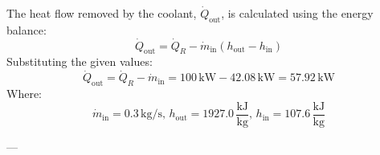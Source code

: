 The heat flow removed by the coolant, \( \dot{Q}_{\text{out}} \), is calculated using the energy balance:  
\[
\dot{Q}_{\text{out}} = \dot{Q}_R - \dot{m}_{\text{in}} (h_{\text{out}} - h_{\text{in}})
\]  
Substituting the given values:  
\[
\dot{Q}_{\text{out}} = \dot{Q}_R - \dot{m}_{\text{in}} = 100 \, \text{kW} - 42.08 \, \text{kW} = 57.92 \, \text{kW}
\]  
Where:  
\[
\dot{m}_{\text{in}} = 0.3 \, \text{kg/s}, \, h_{\text{out}} = 1927.0 \, \frac{\text{kJ}}{\text{kg}}, \, h_{\text{in}} = 107.6 \, \frac{\text{kJ}}{\text{kg}}
\]  

---